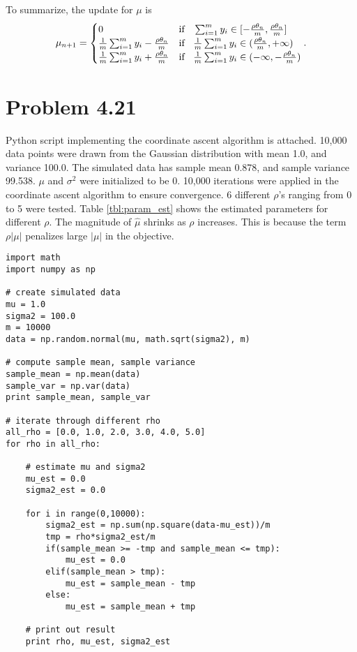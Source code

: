 \documentclass{scrartcl}
\begin{document}
To summarize, the update for $\mu$ is
\begin{equation}
\mu_{n+1} = 
\begin{cases}
0 & \text{if \;\;} \sum_{i=1}^m y_i \in [-{\rho \theta_n \over m}, {\rho \theta_n \over m}] \\
{1 \over m} \sum_{i=1}^m y_i - {\rho \theta_n \over m} & \text{if \;\;}
{1 \over m} \sum_{i=1}^m y_i \in ({\rho \theta_n \over m}, +\infty) \\
{1 \over m} \sum_{i=1}^m y_i + {\rho \theta_n \over m} & \text{if \;\;}
{1 \over m} \sum_{i=1}^m y_i \in (-\infty, -{\rho \theta_n \over m})
\end{cases}.
\end{equation}


\section*{Problem 4.21}

Python script implementing the coordinate ascent algorithm is attached.
10,000 data points were drawn from the Gaussian distribution with mean 1.0,
and variance 100.0.
The simulated data has sample mean 0.878, and sample variance 99.538.
$\mu$ and $\sigma^2$ were initialized to be 0.
10,000 iterations were applied in the coordinate ascent algorithm to ensure convergence.
6 different $\rho$'s ranging from 0 to 5 were tested.
Table \ref{tbl:param_est} shows the estimated parameters for different $\rho$.
The magnitude of $\hat{\mu}$ shrinks as $\rho$ increases. This is because the term
$\rho|\mu|$ penalizes large $|\mu|$ in the objective.

\begin{verbatim}
import math
import numpy as np

# create simulated data
mu = 1.0
sigma2 = 100.0
m = 10000
data = np.random.normal(mu, math.sqrt(sigma2), m)

# compute sample mean, sample variance
sample_mean = np.mean(data)
sample_var = np.var(data)
print sample_mean, sample_var

# iterate through different rho
all_rho = [0.0, 1.0, 2.0, 3.0, 4.0, 5.0]
for rho in all_rho:
    
    # estimate mu and sigma2
    mu_est = 0.0
    sigma2_est = 0.0

    for i in range(0,10000):
        sigma2_est = np.sum(np.square(data-mu_est))/m
        tmp = rho*sigma2_est/m
        if(sample_mean >= -tmp and sample_mean <= tmp):
            mu_est = 0.0
        elif(sample_mean > tmp):
            mu_est = sample_mean - tmp
        else:
            mu_est = sample_mean + tmp
    
    # print out result
    print rho, mu_est, sigma2_est
\end{verbatim}
\end{document}
